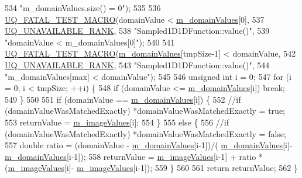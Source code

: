 \begin{DoxyCode}
534                       \textcolor{stringliteral}{"m\_domainValues.size() = 0"});
535 
536   \hyperlink{_defines_8h_a56d63d18d0a6d45757de47fcc06f574d}{UQ\_FATAL\_TEST\_MACRO}(domainValue < \hyperlink{class_q_u_e_s_o_1_1_sampled1_d1_d_function_a6985db1a50a72a3fb1377645ac6cd944}{m\_domainValues}[0],
537                       \hyperlink{namespace_q_u_e_s_o_a7d4679800a430ae8e473c1c7bc0bfb21}{UQ\_UNAVAILABLE\_RANK},
538                       \textcolor{stringliteral}{"Sampled1D1DFunction::value()"},
539                       \textcolor{stringliteral}{"domainValue < m\_domainValues[0]"});
540 
541   \hyperlink{_defines_8h_a56d63d18d0a6d45757de47fcc06f574d}{UQ\_FATAL\_TEST\_MACRO}(\hyperlink{class_q_u_e_s_o_1_1_sampled1_d1_d_function_a6985db1a50a72a3fb1377645ac6cd944}{m\_domainValues}[tmpSize-1] < domainValue,
542                       \hyperlink{namespace_q_u_e_s_o_a7d4679800a430ae8e473c1c7bc0bfb21}{UQ\_UNAVAILABLE\_RANK},
543                       \textcolor{stringliteral}{"Sampled1D1DFunction::value()"},
544                       \textcolor{stringliteral}{"m\_domainValues[max] < domainValue"});
545 
546   \textcolor{keywordtype}{unsigned} \textcolor{keywordtype}{int} i = 0;
547   \textcolor{keywordflow}{for} (i = 0; i < tmpSize; ++i) \{
548     \textcolor{keywordflow}{if} (domainValue <= \hyperlink{class_q_u_e_s_o_1_1_sampled1_d1_d_function_a6985db1a50a72a3fb1377645ac6cd944}{m\_domainValues}[i]) \textcolor{keywordflow}{break};
549   \}
550 
551   \textcolor{keywordflow}{if} (domainValue == \hyperlink{class_q_u_e_s_o_1_1_sampled1_d1_d_function_a6985db1a50a72a3fb1377645ac6cd944}{m\_domainValues}[i]) \{
552     \textcolor{comment}{//if (domainValueWasMatchedExactly) *domainValueWasMatchedExactly = true;}
553     returnValue = \hyperlink{class_q_u_e_s_o_1_1_sampled1_d1_d_function_a5569dd39ba1eb7183b608b59e4919a6f}{m\_imageValues}[i];
554   \}
555   \textcolor{keywordflow}{else} \{
556     \textcolor{comment}{//if (domainValueWasMatchedExactly) *domainValueWasMatchedExactly = false;}
557     \textcolor{keywordtype}{double} ratio = (domainValue - \hyperlink{class_q_u_e_s_o_1_1_sampled1_d1_d_function_a6985db1a50a72a3fb1377645ac6cd944}{m\_domainValues}[i-1])/(
      \hyperlink{class_q_u_e_s_o_1_1_sampled1_d1_d_function_a6985db1a50a72a3fb1377645ac6cd944}{m\_domainValues}[i]-\hyperlink{class_q_u_e_s_o_1_1_sampled1_d1_d_function_a6985db1a50a72a3fb1377645ac6cd944}{m\_domainValues}[i-1]);
558     returnValue = \hyperlink{class_q_u_e_s_o_1_1_sampled1_d1_d_function_a5569dd39ba1eb7183b608b59e4919a6f}{m\_imageValues}[i-1] + ratio * (\hyperlink{class_q_u_e_s_o_1_1_sampled1_d1_d_function_a5569dd39ba1eb7183b608b59e4919a6f}{m\_imageValues}[i]-
      \hyperlink{class_q_u_e_s_o_1_1_sampled1_d1_d_function_a5569dd39ba1eb7183b608b59e4919a6f}{m\_imageValues}[i-1]);
559   \}
560 
561   \textcolor{keywordflow}{return} returnValue;
562 \}
\end{DoxyCode}


